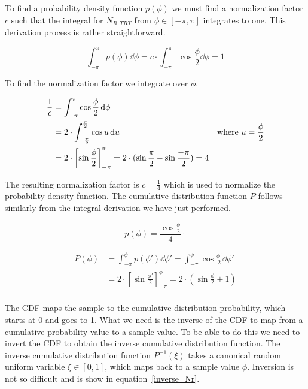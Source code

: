 \documentclass[12pt,a4paper,twoside]{article}
\begin{document}
To find a probability density function $p(\phi)$ we must find a normalization factor $c$ such that the integral for $N_{R, TRT}$ from $\phi \in [-\pi, \pi]$ integrates to one. This derivation process is rather straightforward.

\begin{equation}
\int_{-\pi}^{\pi} p(\phi) \dd{\phi} = c \cdot \int_{-\pi}^{\pi} \cos \frac{\phi}{2} \dd{\phi} = 1
\end{equation}

To find the normalization factor we integrate over $\phi$.

\begin{align}
\frac{1}{c} & = \int_{-\pi}^{\pi} \cos \frac{\phi}{2} \dd{\phi} \\
 & = 2 \cdot \int_{-\frac{\pi}{2}}^\frac{\pi}{2} \cos u \dd{u}  & \textnormal{where  $u = \frac{\phi}{2}$}\\
 & = 2 \cdot \left[ \sin \frac{\phi}{2} \right]_{-\pi}^{\pi} = 2 \cdot (\sin \frac{\pi}{2} - \sin \frac{-\pi}{2}) = 4
\end{align}

The resulting normalization factor is $c = \frac{1}{4}$ which is used to normalize the probability density function. The cumulative distribution function $P$ follows similarly from the integral derivation we have just performed.

\begin{equation}
p(\phi) = \frac{ \cos \frac{\phi}{2}}{4} \cdot
\end{equation}

 \begin{align*}
P(\phi) & = \int_{-\pi}^{\phi} p(\phi') \dd{\phi'} = \int_{-\pi}^{\phi} \cos \frac{\phi'}{2} \dd{\phi'} \\
&  = 2 \cdot \left[\sin \frac{\phi'}{2} \right]_{-\pi}^{\phi} = 2 \cdot \left(\sin \frac{\phi}{2} + 1\right) \\
\end{align*}

The CDF maps the sample to the cumulative distribution probability, which starts at 0 and goes to 1. What we need is the inverse of the CDF to map from a cumulative probability value to a sample value. To be able to do this we need to invert the CDF to obtain the inverse cumulative distribution function. The inverse cumulative distribution function $P^{-1}(\xi)$ takes a canonical random uniform variable $\xi \in [0, 1]$, which maps back to a sample value $\phi$. Inversion is not so difficult and is show in equation~\ref{inverse_Nr}.
\end{document}
